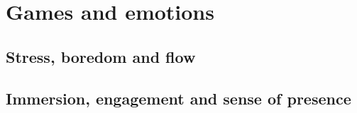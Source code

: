 \chapter{Games and emotions}

\section{Stress, boredom and flow}

\section{Immersion, engagement and sense of presence}
